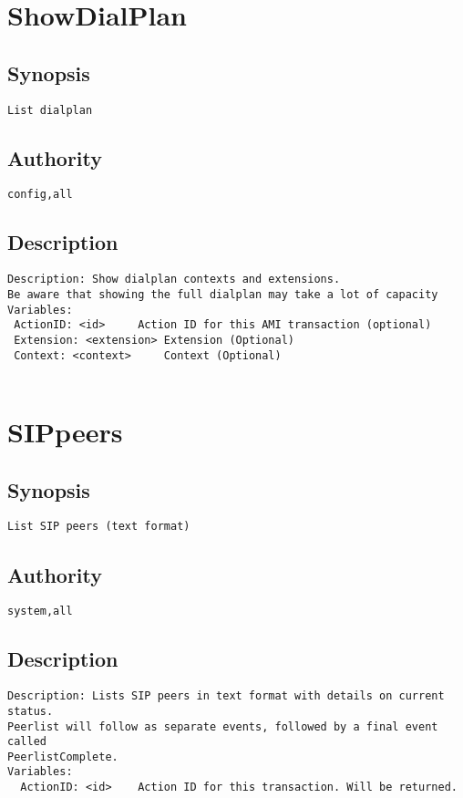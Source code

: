 \section{ShowDialPlan}
\subsection{Synopsis}
\begin{verbatim}
List dialplan
\end{verbatim}
\subsection{Authority}
\begin{verbatim}
config,all
\end{verbatim}
\subsection{Description}
\begin{verbatim}
Description: Show dialplan contexts and extensions.
Be aware that showing the full dialplan may take a lot of capacity
Variables: 
 ActionID: <id>		Action ID for this AMI transaction (optional)
 Extension: <extension>	Extension (Optional)
 Context: <context>		Context (Optional)


\end{verbatim}


\section{SIPpeers}
\subsection{Synopsis}
\begin{verbatim}
List SIP peers (text format)
\end{verbatim}
\subsection{Authority}
\begin{verbatim}
system,all
\end{verbatim}
\subsection{Description}
\begin{verbatim}
Description: Lists SIP peers in text format with details on current status.
Peerlist will follow as separate events, followed by a final event called
PeerlistComplete.
Variables: 
  ActionID: <id>	Action ID for this transaction. Will be returned.

\end{verbatim}


